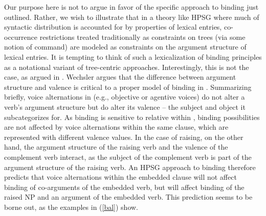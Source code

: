 \documentclass[output=paper,biblatex,babelshorthands,newtxmath,draftmode,colorlinks,citecolor=brown]{langscibook}
\begin{document}
\largerpage
Our purpose here is not to argue in favor of the specific approach to binding just outlined. Rather,
we wish to illustrate that in a theory like HPSG where much of syntactic distribution is accounted
for by properties of lexical entries, co-occurrence restrictions treated traditionally as
constraints on trees (via some notion of command) are modeled as constraints on the argument
structure of lexical entries. It is tempting to think of such a lexicalization of binding principles
as a notational variant of tree-centric approaches. Interestingly, this is not the case, as argued
in . Wechsler argues that the difference between argument structure and valence
is critical to a proper model of binding in . Summarizing briefly, voice alternations
in  (e.g., objective or agentive voices)
do not alter a verb's argument structure but do alter its valence -- the subject and object it
subcategorizes for. As binding is sensitive to relative  within , binding possibilities are not affected by voice alternations within the same clause, which are represented with different valence values. In the case of raising, on the other hand, the argument structure of the raising verb and the valence of the complement verb interact, as the subject of the complement verb is part of the argument structure of the raising verb. An HPSG approach to binding therefore predicts that voice alternations within the embedded clause will not affect binding of co-arguments of the embedded verb, but will affect binding of the raised NP and an argument of the embedded verb. This prediction seems to be borne out, as the  examples in (\ref{bal}) show. 
\end{document}
